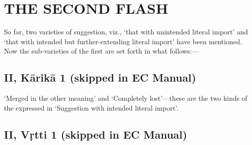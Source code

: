 \documentclass[12pt]{book}
\begin{document}









\chapter{THE SECOND FLASH}

So far, two varieties of suggestion, viz., `that with unintended
literal import' and `that with intended but further-extending
literal import' have been mentioned. Now the sub-varieties of
the first are set forth in what follows:---


\section{II, Kārikā 1 (skipped in EC Manual)}

`Merged in the other meaning' and `Completely lost'---these
are the two kinds of the expressed in `Suggestion with intended
literal import'.


\section{II, Vṛtti 1 (skipped in EC Manual)}
\end{document}
